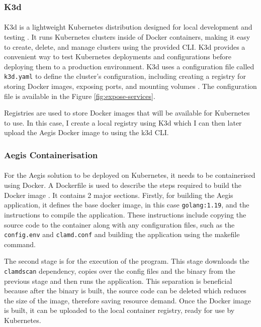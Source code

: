\documentclass[12pt, conference, final, a4paper, onecolumn, compsoc]{IEEEtran}
\begin{document}
\subsubsection*{K3d}
\paragraph{}
K3d is a lightweight Kubernetes distribution designed for local
development and testing \citep{k3d}. It runs Kubernetes clusters inside of Docker
containers, making it easy to create, delete, and manage clusters using the
provided CLI. K3d provides a convenient way to test Kubernetes deployments and
configurations before deploying them to a production environment. K3d uses a
configuration file called \texttt{k3d.yaml} to define the cluster's
configuration, including creating a registry for storing Docker images, exposing
ports, and mounting volumes \citep{k3d-conf}. The configuration file is
available in the Figure \ref{fig:expose-services}.

Registries are used to store Docker images that will be available for Kubernetes
to use. In this case, I create a local registry using K3d which I can then later
upload the Aegis Docker image to using the k3d CLI.

\subsubsection*{Aegis Containerisation}
\paragraph{}
For the Aegis solution to be deployed on Kubernetes, it needs to be
containerised using Docker. A Dockerfile is used to describe the steps required
to build the Docker image \citep{dockerfile} \citep{dockerfile-micro}. It contains 2 major sections.
Firstly, for building the Aegis application, it defines the base docker image, in this
case \texttt{golang:1.19}, and the instructions to compile the application. These
instructions include copying the source code to the container along with any
configuration files, such as the \texttt{config.env} and \texttt{clamd.conf} and
building the application using the makefile command.

The second stage is for the execution of the program. This stage downloads the
\texttt{clamdscan} dependency, copies over the config files and the binary from
the previous stage and then runs the application. This separation is beneficial
because after the binary is built, the source code can be deleted which reduces
the size of the image, therefore saving resource demand. Once the Docker image
is built, it can be uploaded to the local container registry, ready for use by
Kubernetes.
\end{document}
